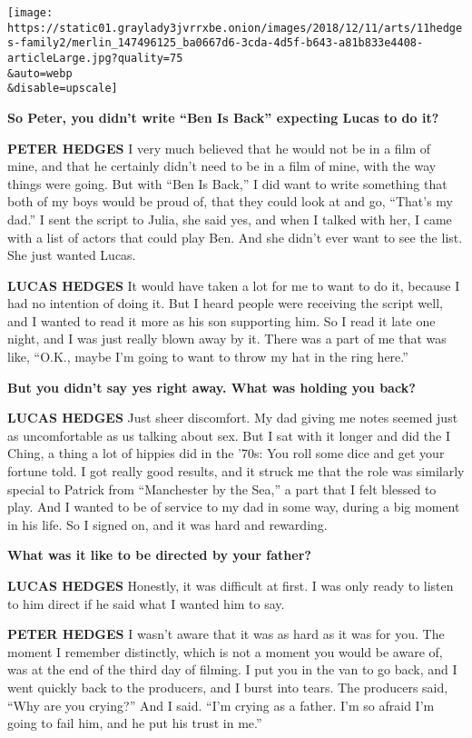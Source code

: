 \texttt{[image: https://static01.graylady3jvrrxbe.onion/images/2018/12/11/arts/11hedges-family2/merlin\_147496125\_ba0667d6-3cda-4d5f-b643-a81b833e4408-articleLarge.jpg?quality=75\\\&auto=webp\\\&disable=upscale]}

\textbf{So Peter, you didn't write ``Ben Is Back'' expecting Lucas to do
it?}

\textbf{PETER HEDGES} I very much believed that he would not be in a
film of mine, and that he certainly didn't need to be in a film of mine,
with the way things were going. But with ``Ben Is Back,'' I did want to
write something that both of my boys would be proud of, that they could
look at and go, ``That's my dad.'' I sent the script to Julia, she said
yes, and when I talked with her, I came with a list of actors that could
play Ben. And she didn't ever want to see the list. She just wanted
Lucas.

\textbf{LUCAS HEDGES} It would have taken a lot for me to want to do it,
because I had no intention of doing it. But I heard people were
receiving the script well, and I wanted to read it more as his son
supporting him. So I read it late one night, and I was just really blown
away by it. There was a part of me that was like, ``O.K., maybe I'm
going to want to throw my hat in the ring here.''

\textbf{But you didn't say yes right away. What was holding you back?}

\textbf{LUCAS HEDGES} Just sheer discomfort. My dad giving me notes
seemed just as uncomfortable as us talking about sex. But I sat with it
longer and did the I Ching, a thing a lot of hippies did in the '70s:
You roll some dice and get your fortune told. I got really good results,
and it struck me that the role was similarly special to Patrick from
``Manchester by the Sea,'' a part that I felt blessed to play. And I
wanted to be of service to my dad in some way, during a big moment in
his life. So I signed on, and it was hard and rewarding.

\textbf{What was it like to be directed by your father?}

\textbf{LUCAS HEDGES} Honestly, it was difficult at first. I was only
ready to listen to him direct if he said what I wanted him to say.

\textbf{PETER HEDGES} I wasn't aware that it was as hard as it was for
you. The moment I remember distinctly, which is not a moment you would
be aware of, was at the end of the third day of filming. I put you in
the van to go back, and I went quickly back to the producers, and I
burst into tears. The producers said, ``Why are you crying?'' And I
said. ``I'm crying as a father. I'm so afraid I'm going to fail him, and
he put his trust in me.''

